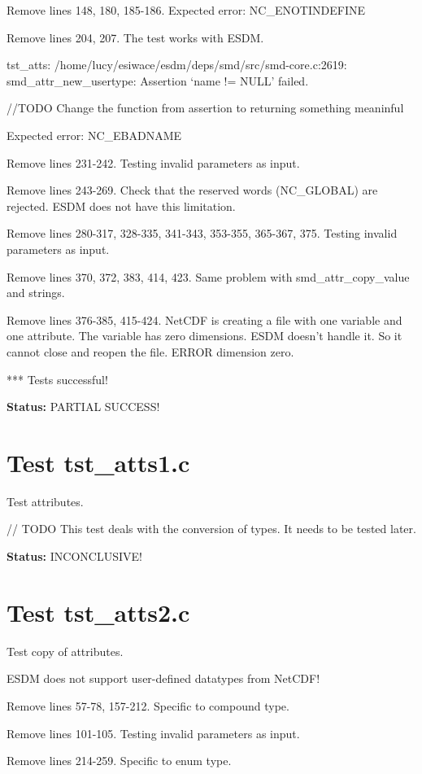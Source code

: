 Remove lines 148, 180, 185-186. Expected error: NC\_ENOTINDEFINE

Remove lines 204, 207. The test works with ESDM.

tst\_atts: /home/lucy/esiwace/esdm/deps/smd/src/smd-core.c:2619: smd\_attr\_new\_usertype: Assertion `name != NULL' failed.

//TODO Change the function from assertion to returning something meaninful

Expected error: NC\_EBADNAME

Remove lines 231-242. Testing invalid parameters as input.

Remove lines 243-269. Check that the reserved words (NC\_GLOBAL) are rejected. ESDM does not have this limitation.

Remove lines 280-317, 328-335, 341-343, 353-355, 365-367, 375. Testing invalid parameters as input.

Remove lines 370, 372, 383, 414, 423. Same problem with smd\_attr\_copy\_value and strings.

Remove lines 376-385, 415-424. NetCDF is creating a file with one variable and one attribute. The variable has zero dimensions. ESDM doesn't handle it. So it cannot close and reopen the file. ERROR dimension zero.

*** Tests successful!

{\bf \large Status: } PARTIAL SUCCESS!

\section{Test tst\_atts1.c}

Test attributes.

// TODO This test deals with the conversion of types. It needs to be tested later.

{\bf \large Status: } INCONCLUSIVE!

\section{Test tst\_atts2.c}

Test copy of attributes.

ESDM does not support user-defined datatypes from NetCDF!

Remove lines 57-78, 157-212. Specific to compound type.

Remove lines 101-105. Testing invalid parameters as input.

Remove lines 214-259. Specific to enum type.

